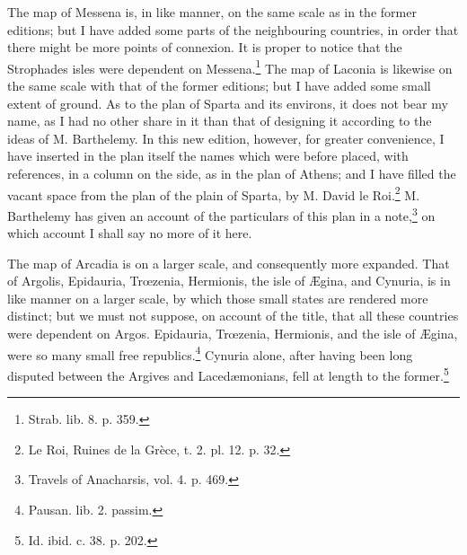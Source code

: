 \documentclass[a4paper, 11pt, oneside, polutonikogreek, english]{article}
\begin{document}
The map of Messena is, in like manner, on the same scale as in the former editions; but I have added some parts of the neighbouring countries, in order that there might be more points of connexion. It is proper to notice that the Strophades isles were dependent on Messena.\footnote{Strab. lib. 8. p. 359.} The map of Laconia is likewise on the same scale with that of the former editions; but I have added some small extent of ground. As to the plan of Sparta and its environs, it does not bear my name, as I had no other share in it than that of designing it according to the ideas of M. Barthelemy. In this new edition, however, for greater convenience, I have inserted in the plan itself the names which were before placed, with references, in a column on the side, as in the plan of Athens; and I have filled the vacant space from the plan of the plain of Sparta, by M. David le Roi.\footnote{Le Roi, Ruines de la Grèce, t. 2. pl. 12. p. 32.} M. Barthelemy has given an account of the particulars of this plan in a note,\footnote{Travels of Anacharsis, vol. 4. p. 469.} on which account I shall say no more of it here.

The map of Arcadia is on a larger scale, and consequently more expanded. That of Argolis, Epidauria, Trœzenia, Hermionis, the isle of Ægina, and Cynuria, is in like manner on a larger scale, by which those small states are rendered more distinct; but we must not suppose, on account of the title, that all these countries were dependent on Argos. Epidauria, Trœzenia, Hermionis, and the isle of Ægina, were so many small free republics.\footnote{Pausan. lib. 2. passim.} Cynuria alone, after having been long disputed between the Argives and Lacedæmonians, fell at length to the former.\footnote{Id. ibid. c. 38. p. 202.}
\end{document}
